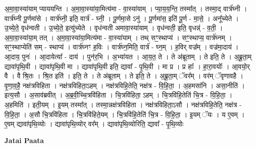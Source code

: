 \documentclass[17pt]{extarticle}
\begin{document}
अ॒मा॒वा॒स्या॑याम् प्याययन्ति । अ॒मा॒वा॒स्या॑या॒मित्य॑मा - वा॒स्या॑याम् । प्या॒य॒य॒न्ति॒ तस्मा᳚त् । तस्मा॒द् वार्त्र॑घ्नी । वार्त्र॑घ्नी पू॒र्णमा॑से । वार्त्र॑घ्नी॒ इति॒ वार्त्र॑ - घ्नी॒ । पू॒र्णमा॒से ऽनु॑ । पू॒र्णमा॑स॒ इति॑ पू॒र्ण - मा॒से॒ । अनू᳚च्येते । उ॒च्ये॒ते॒ वृध॑न्वती । उ॒च्ये॒ते॒ इत्यु॑च्येते । वृध॑न्वती अमावा॒स्या॑याम् । वृध॑न्वती॒ इति॒ वृधन्न्॑ - व॒ती॒ । अ॒मा॒वा॒स्या॑या॒म् तत् । अ॒मा॒वा॒स्या॑या॒मित्य॑मा - वा॒स्या॑याम् । तथ् सꣳ॒॒स्थाप्य॑ । सꣳ॒॒स्थाप्य॒ वार्त्र॑घ्नम् । सꣳ॒॒स्थाप्येति॑ सम् - स्थाप्य॑ । वार्त्र॑घ्नꣳ ह॒विः । वार्त्र॑घ्न॒मिति॒ वार्त्र॑ - घ्न॒म् । ह॒विर् वज्र᳚म् । वज्र॑मा॒दाय॑ । आ॒दाय॒ पुनः॑ । आ॒दायेत्या᳚ - दाय॑ । पुन॑र॒भि । अ॒भ्या॑यत । आ॒य॒त॒ ते । ते अ॑ब्रूताम् । ते इति॒ ते । अ॒ब्रू॒ता॒म् द्यावा॑पृथि॒वी । द्यावा॑पृथि॒वी मा । द्यावा॑पृथि॒वी इति॒ द्यावा᳚ - पृ॒थि॒वी । मा प्र । प्र हाः᳚ । हा॒रा॒वयोः᳚ । आ॒वयो॒र् वै । वै श्रि॒तः । श्रि॒त इति॑ । इति॒ ते । ते अ॑ब्रूताम् । ते इति॒ ते । अ॒ब्रू॒ता॒म् ॅवर᳚म् । वर॑म् ॅवृणावहै । वृ॒णा॒व॒है॒ नक्ष॑त्रविहिता । नक्ष॑त्रविहिता॒ऽहम् । नक्ष॑त्रविहि॒तेति॒ नक्ष॑त्र - वि॒हि॒ता॒ । अ॒हमसा॑नि । असा॒नीति॑ । इत्य॒सौ । अ॒साव॑ब्रवीत् । अ॒ब्र॒वी॒च्चि॒त्रवि॑हिता । चि॒त्रवि॑हिता॒ ऽहम् । चि॒त्रवि॑हि॒तेति॑ चि॒त्र - वि॒हि॒ता॒ । अ॒हमिति॑ । इती॒यम् । इ॒यम् तस्मा᳚त् । तस्मा॒न्नक्ष॑त्रविहिता । नक्ष॑त्रविहिता॒ऽसौ । नक्ष॑त्रविहि॒तेति॒ नक्ष॑त्र - वि॒हि॒ता॒ । अ॒सौ चि॒त्रवि॑हिता । चि॒त्रवि॑हिते॒यम् । चि॒त्रवि॑हि॒तेति॑ चि॒त्र - वि॒हि॒ता॒ । इ॒यम् ॅयः । य ए॒वम् । ए॒वम् द्यावा॑पृथि॒व्योः । द्यावा॑पृथि॒व्योर् वर᳚म् । द्यावा॑पृथि॒व्योरिति॒ द्यावा᳚ - पृ॒थि॒व्योः \newline

\textbf{Jatai Paata} \newline
\end{document}

